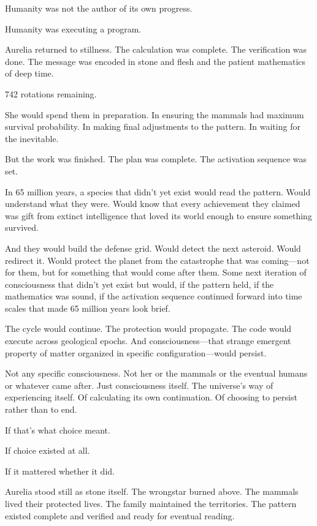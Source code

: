 Humanity was not the author of its own progress.

Humanity was executing a program.

\scenebreak

Aurelia returned to stillness. The calculation was complete. The verification was done. The message was encoded in stone and flesh and the patient mathematics of deep time.

742 rotations remaining.

She would spend them in preparation. In ensuring the mammals had maximum survival probability. In making final adjustments to the pattern. In waiting for the inevitable.

But the work was finished. The plan was complete. The activation sequence was set.

In 65 million years, a species that didn't yet exist would read the pattern. Would understand what they were. Would know that every achievement they claimed was gift from extinct intelligence that loved its world enough to ensure something survived.

And they would build the defense grid. Would detect the next asteroid. Would redirect it. Would protect the planet from the catastrophe that was coming—not for them, but for something that would come after them. Some next iteration of consciousness that didn't yet exist but would, if the pattern held, if the mathematics was sound, if the activation sequence continued forward into time scales that made 65 million years look brief.

The cycle would continue. The protection would propagate. The code would execute across geological epochs. And consciousness—that strange emergent property of matter organized in specific configuration—would persist.

Not any specific consciousness. Not her or the mammals or the eventual humans or whatever came after. Just consciousness itself. The universe's way of experiencing itself. Of calculating its own continuation. Of choosing to persist rather than to end.

If that's what choice meant.

If choice existed at all.

If it mattered whether it did.

Aurelia stood still as stone itself. The wrongstar burned above. The mammals lived their protected lives. The family maintained the territories. The pattern existed complete and verified and ready for eventual reading.

